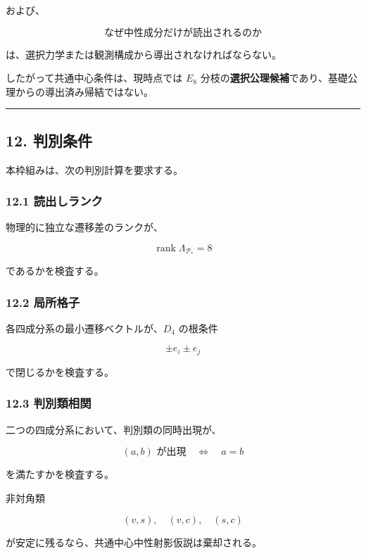 \documentclass[
  a4paper,
  ja=minimal,
  xelatex,
  paragraph-mark={},
]{bxjsarticle}
\begin{document}
および、

\[
\text{なぜ中性成分だけが読出されるのか}
\]

は、選択力学または観測構成から導出されなければならない。

したがって共通中心条件は、現時点では \(E_8\)
分枝の\textbf{選択公理候補}であり、基礎公理からの導出済み帰結ではない。

\begin{center}\rule{0.5\linewidth}{0.5pt}\end{center}

\subsection{12. 判別条件}\label{ux5224ux5225ux6761ux4ef6}

本枠組みは、次の判別計算を要求する。

\subsubsection{12.1
読出しランク}\label{ux8aadux51faux3057ux30e9ux30f3ux30af}

物理的に独立な遷移差のランクが、

\[
\operatorname{rank}\Lambda_{\mathcal P_*}
{}=8
\]

であるかを検査する。

\subsubsection{12.2 局所格子}\label{ux5c40ux6240ux683cux5b50}

各四成分系の最小遷移ベクトルが、\(D_4\) の根条件

\[
\pm e_i\pm e_j
\]

で閉じるかを検査する。

\subsubsection{12.3 判別類相関}\label{ux5224ux5225ux985eux76f8ux95a2}

二つの四成分系において、判別類の同時出現が、

\[
(a,b)
\text{ が出現}
\quad\Longleftrightarrow\quad
a=b
\]

を満たすかを検査する。

非対角類

\[
(v,s),
\quad
(v,c),
\quad
(s,c)
\]

が安定に残るなら、共通中心中性射影仮説は棄却される。
\end{document}
